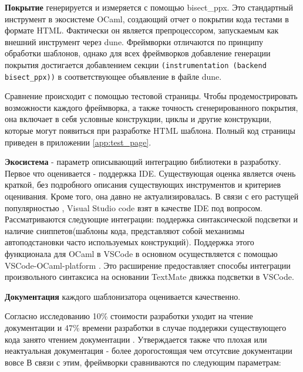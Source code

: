 \textbf{Покрытие} генерируется и измеряется с помощью bisect\_ppx.
Это стандартный инструмент в экосистеме OCaml, создающий отчет о покрытии кода тестами в формате HTML.
Фактически он является препроцессором, запускаемым как внешний инструмент через dune.
Фреймворки отличаются по принципу обработки шаблонов, однако для всех фреймворков добавление генерации покрытия достигается добавлением секции \texttt{(instrumentation (backend bisect\_ppx))} в соответствующее объявление в файле dune.

Сравнение происходит с помощью тестовой страницы.
Чтобы продемострировать возможности каждого фреймворка, а также точность сгенерированного покрытия, она включает в себя условные конструкции, циклы и другие конструкции, которые могут появиться при разработке HTML шаблона.
Полный код страницы приведен в приложении \ref{app:test_page}.

\textbf{Экосистема} - параметр описывающий интеграцию библиотеки в разработку.
Первое что оценивается - поддержка IDE.
Существующая оценка является очень краткой, без подробного описания существующих инструментов и критериев оценивания.
Кроме того, она давно не актуализировалась.
В связи с его растущей популярностью \cite{VSCode2025}, Visual Studio code взят в качестве IDE под вопросом.
Рассматриваются следующие интеграции: поддержка синтаксической подсветки и наличие сниппетов(шаблоны кода, представляют собой механизмы автоподстановки часто используемых конструкций).
Поддержка этого функционала для OCaml в VSCode в основном осуществляется с помощью VSCode-OCaml-platform \cite{VSCodeOcaml2025}.
Это расширение предоставляет способы интеграции произвольного синтаксиса на основании TextMate движка подсветки в VSCode.





\textbf{Документация} каждого шаблонизатора оценивается качественно.

Согласно исследованию\cite{boehm1975high} %
10\% стоимости разработки уходит на чтение документации %
и 47\% времени разработки в случае поддержки существующего кода занято чтением документации \cite{fjeldstad1983application}.
Утверждается также что плохая или неактуальная документация - более дорогостоящая чем отсутсвие документации вовсе\cite{poston1984does}
В связи с этим, фреймворки сравниваются по следующим параметрам:

